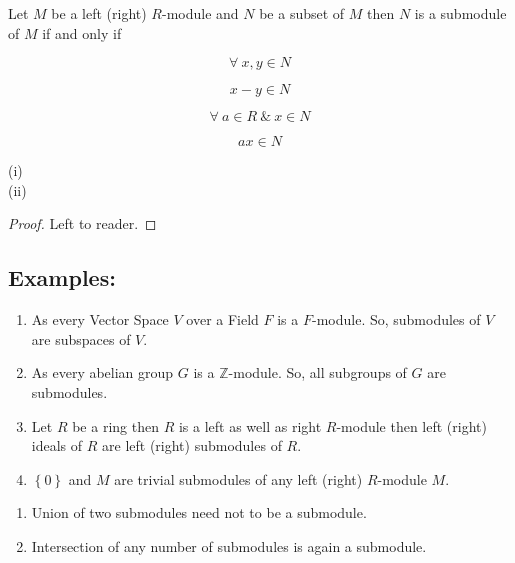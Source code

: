 \begin{thm}

Let $M$ be a left (right) $R$-module and $N$ be a subset of $M$ then $N$ is a submodule of $M$ if and only if

\[
\forall \ x , y  \in N 
\]

\[
x-y \in N 
\]

\[
\forall \ a \in R \ \&\ x \in N 
\]

\[
a x \in N 
\]

\begin{description}
		\item[(i)]
		\marginnote[2.5em]{ } 
		\item[(ii)]
		\marginnote[2.5em]{} 
	
\end{description}

\end{thm}

\begin{proof}
	Left to reader.

\end{proof}
\bigskip

\subsection{Examples:}

\begin{enumerate}
	\item As every Vector Space $V$ over a Field $F$ is a $F$-module. So, submodules of $V$ are subspaces of $V$.
	\item As every abelian group $G$ is a $\mathbb{Z}$-module. So, all subgroups of $G$ are submodules.
	\item Let $R$ be a ring then $R$ is a left as well as right $R$-module then left (right) ideals of $R$ are left (right) submodules of $R$.
	\item $\left\{0\right\}$ and $M$ are trivial submodules of any left (right) $R$-module $M$.

\end{enumerate}
\bigskip

\begin{remark}
\qquad

\begin{enumerate}
		\item Union of two submodules need not to be a submodule.
		
		\item Intersection of any number of submodules is again a submodule.
	
\end{enumerate}

\end{remark}
\bigskip

